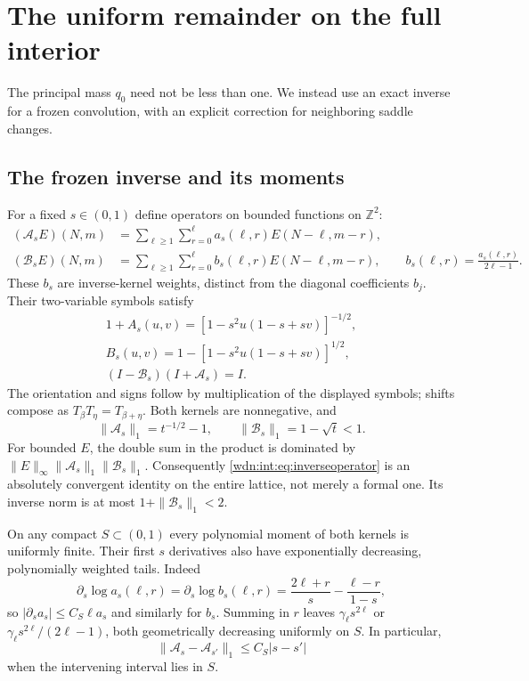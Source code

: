 \documentclass[11pt,letterpaper]{article}
\theoremstyle{remark}\newtheorem{remark}[theorem]{Remark}
\newcommand{\Z}{\mathbb Z}
\begin{document}
\section{The uniform remainder on the full interior}\label{wdn:int:sec:fullrange}
The principal mass $q_0$ need not be less than one. We instead use an
exact inverse for a frozen convolution, with an explicit correction for
neighboring saddle changes.

\subsection{The frozen inverse and its moments}
For a fixed $s\in(0,1)$ define operators on bounded functions on $\Z^2$:
\begin{align}
 (\mathcal A_s E)(N,m)
 &=\sum_{\ell\ge1}\sum_{r=0}^{\ell}a_s(\ell,r)E(N-\ell,m-r),
 \label{wdn:int:eq:Aoperator}\\
 (\mathcal B_s E)(N,m)
 &=\sum_{\ell\ge1}\sum_{r=0}^{\ell}b_s(\ell,r)E(N-\ell,m-r),\qquad
 b_s(\ell,r)=\frac{a_s(\ell,r)}{2\ell-1}.
 \label{wdn:int:eq:Boperator}
\end{align}
These $b_s$ are inverse-kernel weights, distinct from the diagonal
coefficients $b_j$. Their two-variable symbols satisfy
\begin{gather}
 1+A_s(u,v)=[1-s^2u(1-s+sv)]^{-1/2},\label{wdn:int:eq:Asymbol}\\
 B_s(u,v)=1-[1-s^2u(1-s+sv)]^{1/2},\label{wdn:int:eq:Bsymbol}\\
 (I-\mathcal B_s)(I+\mathcal A_s)=I.\label{wdn:int:eq:inverseoperator}
\end{gather}
The orientation and signs follow by multiplication of the displayed
symbols; shifts compose as $T_{\beta}T_{\eta}=T_{\beta+\eta}$. Both
kernels are nonnegative, and
\begin{equation}\label{wdn:int:eq:kernelmasses}
 \|\mathcal A_s\|_1=t^{-1/2}-1,\qquad
 \|\mathcal B_s\|_1=1-\sqrt t<1.
\end{equation}
For bounded $E$, the double sum in the product is dominated by
$\|E\|_\infty\|\mathcal A_s\|_1\|\mathcal B_s\|_1$.
Consequently \eqref{wdn:int:eq:inverseoperator} is an absolutely convergent
identity on the entire lattice, not merely a formal one. Its inverse
norm is at most $1+\|\mathcal B_s\|_1<2$.

On any compact $S\subset(0,1)$ every polynomial moment of both kernels
is uniformly finite. Their first $s$ derivatives also have exponentially
decreasing, polynomially weighted tails. Indeed
\begin{equation}\label{wdn:int:eq:kernelderivative}
 \partial_s\log a_s(\ell,r)
 =\partial_s\log b_s(\ell,r)
 =\frac{2\ell+r}{s}-\frac{\ell-r}{1-s},
\end{equation}
so $|\partial_s a_s|\le C_S\ell a_s$ and similarly for $b_s$.
Summing in $r$ leaves $\gamma_\ell s^{2\ell}$ or
$\gamma_\ell s^{2\ell}/(2\ell-1)$, both geometrically decreasing
uniformly on $S$. In particular,
\begin{equation}\label{wdn:int:eq:Lipschitz}
 \|\mathcal A_s-\mathcal A_{s'}\|_1\le C_S|s-s'|
\end{equation}
when the intervening interval lies in $S$.
\end{document}
